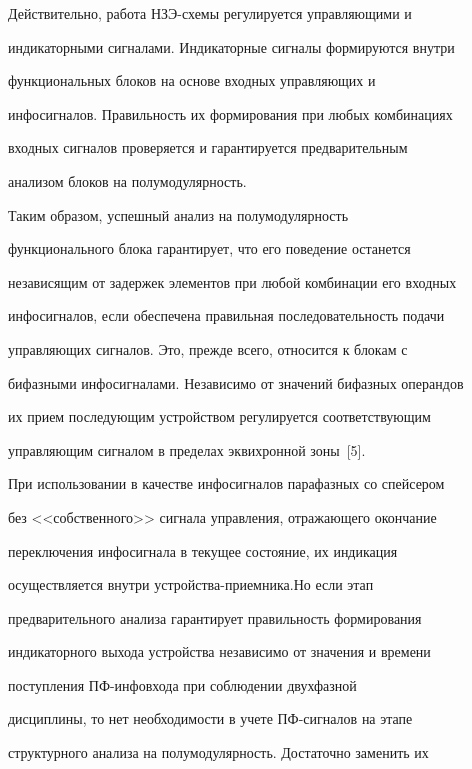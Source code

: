    Действительно, работа НЗЭ-схе\-мы регулируется управ\-ля\-ющи\-ми и


индикаторными сигналами. Индикаторные сигналы формируются внутри


функциональных блоков на основе входных управляющих и


инфосигналов. Правильность их формирования при любых комбинациях


входных сигналов проверяется и гарантируется предварительным


анализом блоков на полумодулярность.





   Таким образом, успешный анализ на полумодулярность\linebreak 


функционального блока гарантирует, что его поведение останется


независящим от задержек элементов при любой комбинации его входных


инфосигналов, если обеспечена правильная последовательность подачи


управляющих сигналов. Это, прежде всего, относится к блокам с


бифазными инфосигналами. Независимо от значений бифазных операндов


их прием последующим устройством регулируется соответствующим


управляющим сигналом в пределах эквихронной зоны~[5].





   При использовании в качестве инфосигналов парафазных со спейсером


без <<собственного>> сигнала управления, отража\-юще\-го окончание


переключения инфосигнала в текущее состояние, их индикация


осуществляется внутри устрой\-ст\-ва-при\-ем\-ни\-ка.\linebreak  Но если этап


предварительного анализа гарантирует правильность формирования


индикаторного выхода устройства независимо от значения и времени


поступления ПФ-ин\-фо\-вхо\-да при соблюдении двухфазной


дисциплины, то нет необходимости в учете ПФ-сиг\-на\-лов на этапе


структурного анализа на полумодулярность. Достаточно заменить их


